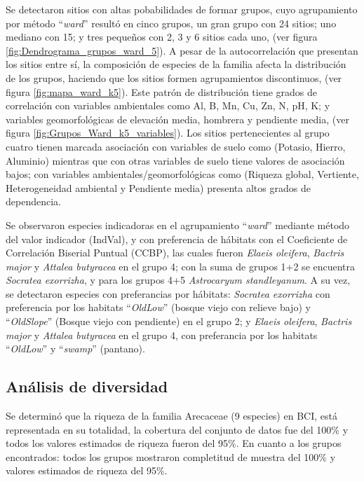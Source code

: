 \documentclass[11pt,]{article}
\begin{document}
Se detectaron sitios con altas pobabilidades de formar grupos, cuyo
agrupamiento por método ``\emph{ward}'' resultó en cinco grupos, un gran
grupo con 24 sitios; uno mediano con 15; y tres pequeños con 2, 3 y 6
sitios cada uno, (ver figura \ref{fig:Dendrograma_grupos_ward_5}). A
pesar de la autocorrelación que presentan los sitios entre sí, la
composición de especies de la familia afecta la distribución de los
grupos, haciendo que los sitios formen agrupamientos discontinuos, (ver
figura \ref{fig:mapa_ward_k5}). Este patrón de distribución tiene grados
de correlación con variables ambientales como Al, B, Mn, Cu, Zn, N, pH,
K; y variables geomorfológicas de elevación media, hombrera y pendiente
media, (ver figura \ref{fig:Grupos_Ward_k5_variables}). Los sitios
pertenecientes al grupo cuatro tienen marcada asociación con variables
de suelo como (Potasio, Hierro, Aluminio) mientras que con otras
variables de suelo tiene valores de asociación bajos; con variables
ambientales/geomorfológicas como (Riqueza global, Vertiente,
Heterogeneidad ambiental y Pendiente media) presenta altos grados de
dependencia.

Se observaron especies indicadoras en el agrupamiento ``\emph{ward}''
mediante método del valor indicador (IndVal), y con preferencia de
hábitats con el Coeficiente de Correlación Biserial Puntual (CCBP), las
cuales fueron \emph{Elaeis oleifera}, \emph{Bactris major} y
\emph{Attalea butyracea} en el grupo 4; con la suma de grupos 1+2 se
encuentra \emph{Socratea exorrizha}, y para los grupos 4+5
\emph{Astrocaryum standleyanum}. A su vez, se detectaron especies con
preferancias por hábitats: \emph{Socratea exorrizha} con preferencia por
los habitats ``\emph{OldLow}'' (bosque viejo con relieve bajo) y
``\emph{OldSlope}'' (Bosque viejo con pendiente) en el grupo 2; y
\emph{Elaeis oleifera}, \emph{Bactris major} y \emph{Attalea butyracea}
en el grupo 4, con preferancia por los habitats ``\emph{OldLow}'' y
``\emph{swamp}'' (pantano).

\subsection{Análisis de diversidad}\label{anuxe1lisis-de-diversidad}

Se determinó que la riqueza de la familia Arecaceae (9 especies) en BCI,
está representada en su totalidad, la cobertura del conjunto de datos
fue del 100\% y todos los valores estimados de riqueza fueron del 95\%.
En cuanto a los grupos encontrados: todos los grupos mostraron
completitud de muestra del 100\% y valores estimados de riqueza del
95\%.
\end{document}
